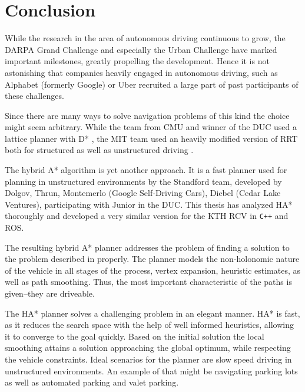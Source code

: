 \chapter{Conclusion}
While the research in the area of autonomous driving continuous to grow, the DARPA Grand Challenge and especially the Urban Challenge have marked important milestones, greatly propelling the development. Hence it is not astonishing that companies heavily engaged in autonomous driving, such as Alphabet (formerly Google) or Uber recruited a large part of past participants of these challenges.

Since there are many ways to solve navigation problems of this kind the choice might seem arbitrary. While the team from CMU and winner of the DUC used a lattice planner with D* \cite{Ferguson.2008b,Likhachev.2005}, the MIT team used an heavily modified version of RRT both for structured as well as unstructured driving \cite{Kuwata.2008}.

The hybrid A* algorithm is yet another approach. It is a fast planner used for planning in unstructured environments by the Standford team, developed by Dolgov, Thrun, Montemerlo (Google Self-Driving Cars), Diebel (Cedar Lake Ventures), participating with Junior in the DUC.
This thesis has analyzed HA* thoroughly and developed a very similar version for the KTH RCV in \texttt{C++} and ROS.

The resulting hybrid A* planner addresses the problem of finding a solution to the problem described in  properly. The planner models the non-holonomic nature of the vehicle in all stages of the process, vertex expansion, heuristic estimates, as well as path smoothing. Thus, the most important characteristic of the paths is given--they are driveable. 

The HA* planner solves a challenging problem in an elegant manner. HA* is fast, as it reduces the search space with the help of well informed heuristics, allowing it to converge to the goal quickly. Based on the initial solution the local smoothing attains a solution approaching the global optimum, while respecting the vehicle constraints. Ideal scenarios for the planner are slow speed driving in unstructured environments. An example of that might be navigating parking lots as well as automated parking and valet parking.